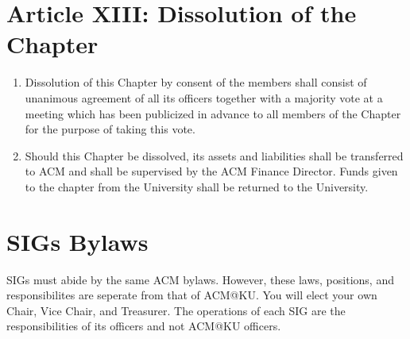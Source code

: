 \section*{Article XIII: Dissolution of the Chapter}

\begin{enumerate}
	\item Dissolution of this Chapter by consent of the members shall consist of unanimous agreement of all its officers together with a majority vote at a meeting which has been publicized in advance to all members of the Chapter for the purpose of taking this vote.
	\item Should this Chapter be dissolved, its assets and liabilities shall be transferred to ACM and shall be supervised by the ACM Finance Director. Funds given to the chapter from the University shall be returned to the University.
\end{enumerate}



\section{SIGs Bylaws}
SIGs must abide by the same ACM bylaws. However, these laws, positions, and responsibilites are seperate from that of ACM@KU. You will elect your own Chair, Vice Chair, and Treasurer. The operations of each SIG are the responsibilities of its officers and not ACM@KU officers.

